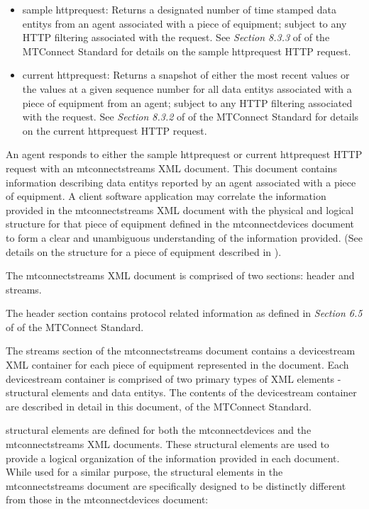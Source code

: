 \documentclass{mtconnect}	%
\begin{document}
\begin{itemize}
\item \gls{sample httprequest}:  Returns a designated number of time stamped \glspl{data entity} from an \gls{agent} associated with a piece of equipment; subject to any HTTP filtering associated with the request.  See \textit{Section 8.3.3} of  of the MTConnect Standard for details on the \gls{sample httprequest} HTTP request.

\item \gls{current httprequest}:  Returns a snapshot of either the most recent values or the values at a given sequence number for all \glspl{data entity} associated with a piece of equipment from an \gls{agent}; subject to any HTTP filtering associated with the request.  See \textit{Section 8.3.2} of  of the MTConnect Standard for details on the \gls{current httprequest} HTTP request.
\end{itemize}

An \gls{agent} responds to either the \gls{sample httprequest} or \gls{current httprequest} HTTP request with an \gls{mtconnectstreams} XML document.  This document contains information describing \glspl{data entity} reported by an \gls{agent} associated with a piece of equipment.   A client software application may correlate the information provided in the \gls{mtconnectstreams} XML document with the physical and logical structure for that piece of equipment defined in the \gls{mtconnectdevices} document to form a clear and unambiguous understanding of the information provided.  (See details on the structure for a piece of equipment described in ).

The \gls{mtconnectstreams} XML document is comprised of two sections: \gls{header} and \gls{streams}.

The \gls{header} section contains protocol related information as defined in \textit{Section 6.5} of  of the MTConnect Standard.

The \gls{streams} section of the \gls{mtconnectstreams} document contains a \gls{devicestream} XML container for each piece of equipment represented in the document.  Each \gls{devicestream} container is comprised of two primary types of XML elements - \glspl{structural element} and \glspl{data entity}.  The contents of the \gls{devicestream} container are described in detail in this document,  of the MTConnect Standard.

\glspl{structural element} are defined for both the \gls{mtconnectdevices} and the \gls{mtconnectstreams} XML documents.  These \glspl{structural element} are used to provide a logical organization of the information provided in each document.  While used for a similar purpose, the \glspl{structural element} in the \gls{mtconnectstreams} document are specifically designed to be distinctly different from those in the \gls{mtconnectdevices} document:  
\end{document}
